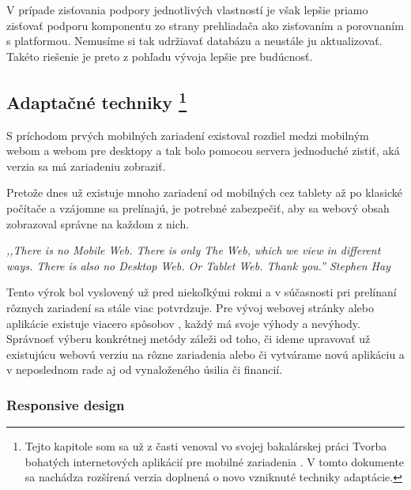 V prípade zisťovania podpory jednotlivých vlastností je však lepšie priamo zisťovať podporu komponentu zo strany prehliadača ako zisťovaním a porovnaním s platformou. Nemusíme si tak udržiavať databázu a neustále ju aktualizovať. Takéto riešenie je preto z pohľadu vývoja lepšie pre budúcnosť.



\newpage

\subsection{Adaptačné techniky \footnote{Tejto kapitole som sa už z časti venoval vo svojej bakalárskej práci Tvorba bohatých internetových aplikácií pre mobilné zariadenia \cite{ja}. V tomto dokumente sa nachádza rozšírená verzia doplnená o novo vzniknuté techniky adaptácie.}} %
\label{sub:adapta_n_techniky}

S príchodom prvých mobilných zariadení existoval rozdiel medzi mobilným webom a webom pre desktopy a tak bolo pomocou servera jednoduché zistiť, aká verzia sa má zariadeniu zobraziť.

Pretože dnes už existuje mnoho zariadení od mobilných cez tablety až po klasické počítače a vzájomne sa prelínajú, je potrebné zabezpečiť, aby sa webový obsah zobrazoval správne na každom z nich.

\begin{fancybox}
\textit{,,There is no Mobile Web. There is only The Web, which we view in different ways. There is also no Desktop Web. Or Tablet Web. Thank you.'' Stephen Hay} \cite{noMobileWeb}
\end{fancybox}

Tento výrok bol vyslovený už pred niekoľkými rokmi a v súčasnosti pri prelínaní rôznych zariadení sa stále viac potvrdzuje. Pre vývoj webovej stránky alebo aplikácie existuje viacero spôsobov \cite{mobiforge}, každý má svoje výhody a nevýhody. Správnosť výberu konkrétnej metódy záleži od toho, či ideme upravovať už existujúcu webovú verziu na rôzne zariadenia alebo či vytvárame novú aplikáciu a v neposlednom rade aj od vynaloženého úsilia či financií.


\subsubsection{Responsive design} %
\label{ssub:responsive_design}

